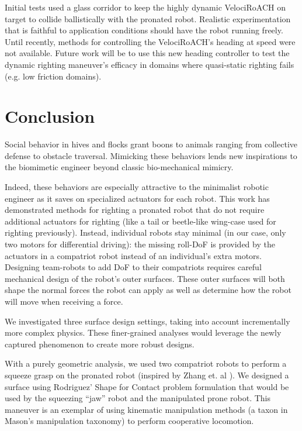 \documentclass[letterpaper, 10 pt, conference]{ieeeconf}
\begin{document}
Initial tests used a glass corridor to keep the highly dynamic VelociRoACH on target to collide ballistically with the pronated robot.
Realistic experimentation that is faithful to application conditions should have the robot running freely.
Until recently, methods for controlling the VelociRoACH's heading at speed were not available.
Future work will be to use this new heading controller to test the dynamic righting maneuver's efficacy in domains where quasi-static righting fails (e.g. low friction domains).





\section{Conclusion}
Social behavior in hives and flocks grant boons to animals ranging from collective defense to obstacle traversal.
Mimicking these behaviors lends new inspirations to the biomimetic engineer beyond classic bio-mechanical mimicry.

Indeed, these behaviors are especially attractive to the minimalist robotic engineer as it saves on specialized actuators for each robot.
This work has demonstrated methods for righting a pronated robot that do not require additional actuators for righting (like a tail \cite{casarezTailRighting} or beetle-like wing-case \cite{li2016cockroach} used for righting previously).
Instead, individual robots stay minimal (in our case, only two motors for differential driving): the missing roll-DoF is provided by the actuators in a compatriot robot instead of an individual's extra motors.
Designing team-robots to add DoF to their compatriots requires careful mechanical design of the robot's outer surfaces.
These outer surfaces will both shape the normal forces the robot can apply as well as determine how the robot will move when receiving a force.

We investigated three surface design settings, taking into account incrementally more complex physics.
These finer-grained analyses would leverage the newly captured phenomenon to create more robust designs.

With a purely geometric analysis, we used two compatriot robots to perform a squeeze grasp on the pronated robot (inspired by Zhang et. al \cite{zhang2002gripper}).
We designed a surface using Rodriguez' Shape for Contact \cite{rodriguez2013effector} problem formulation that would be used by the squeezing ``jaw'' robot and the manipulated prone robot.
This maneuver is an exemplar of using kinematic manipulation methods (a taxon in Mason's \cite{MasonMORMBook} manipulation taxonomy) to perform cooperative locomotion.
\end{document}
